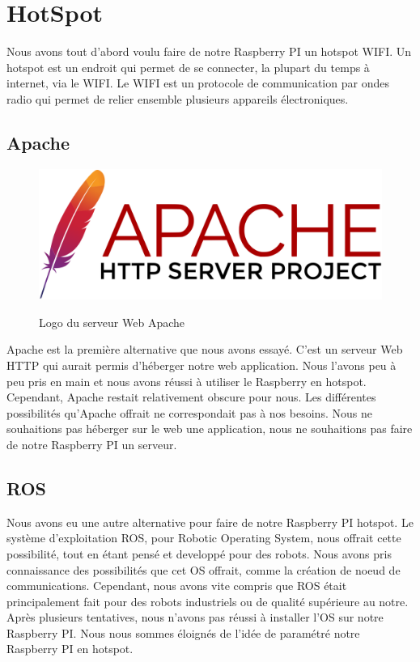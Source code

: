 \documentclass[
	a4paper,									%
	11pt,										%
	twoside,									%
	openright,									%
	notitlepage,									%
	parskip=half,								%
]{scrreprt}										%
\begin{document}
\chapter{HotSpot}

Nous avons tout d'abord voulu faire de notre Raspberry PI un hotspot WIFI. Un hotspot est un endroit
qui permet de se connecter, la plupart du temps à internet, via le WIFI. Le WIFI est un protocole de
communication par ondes radio qui permet de relier ensemble plusieurs appareils électroniques. \par

\section{Apache}

\begin{figure}[!ht]
	\centering
	\includegraphics[scale=.2]{img/Apache.png}
	\label{Apache}
	\caption{Logo du serveur Web Apache}
\end{figure}

Apache est la première alternative que nous avons essayé. C'est un serveur Web HTTP qui aurait permis d'héberger notre web
application. Nous l'avons peu à peu pris en main et nous avons réussi à utiliser le Raspberry en hotspot. Cependant, Apache 
restait relativement obscure pour nous. Les différentes possibilités qu'Apache offrait ne correspondait pas à nos besoins. 
Nous ne souhaitions pas héberger sur le web une application, nous ne souhaitions pas faire de notre Raspberry PI un serveur. \par

\section{ROS}

Nous avons eu une autre alternative pour faire de notre Raspberry PI hotspot. Le système d'exploitation ROS, pour Robotic Operating System, 
nous offrait cette possibilité, tout en étant pensé et developpé pour des robots. Nous avons pris connaissance des possibilités 
que cet OS offrait, comme la création de noeud de communications. Cependant, nous avons vite compris que ROS était principalement
fait pour des robots industriels ou de qualité supérieure au notre. Après plusieurs tentatives, nous n'avons pas réussi à installer 
l'OS sur notre Raspberry PI. Nous nous sommes éloignés de l'idée de paramétré notre Raspberry PI en hotspot. \par
\end{document}
